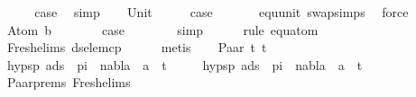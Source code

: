 \begin{isabellebody}
\ \ \isamarkupfalse%
\ \isamarkupfalse%
\ {\isacharquery}{\kern0pt}case\ \isamarkupfalse%
\ simp\isanewline
{}\isamarkupfalse%
\isanewline
\ \ \isamarkupfalse%
\ Unit\isanewline
\ \ \isamarkupfalse%
\ \isamarkupfalse%
\ {\isacharquery}{\kern0pt}case\ \isanewline
\ \ \ \ \isamarkupfalse%
\ equ{\isacharunderscore}{\kern0pt}unit\ swap{\isachardot}{\kern0pt}simps{\isacharparenleft}{\kern0pt}{}{\isacharparenright}{\kern0pt}\ \isamarkupfalse%
\ force\isanewline
{}\isamarkupfalse%
\isanewline
\ \ \isamarkupfalse%
\ {\isacharparenleft}{\kern0pt}Atom\ b{\isacharparenright}{\kern0pt}\isanewline
\ \ \ \ \isamarkupfalse%
\ \isamarkupfalse%
\ {\isacharquery}{\kern0pt}case\isanewline
\ \ \ \ \ \ \isamarkupfalse%
\ simp\isanewline
\ \ \ \ \isamarkupfalse%
\ {\isacharparenleft}{\kern0pt}rule\ equ{\isacharunderscore}{\kern0pt}atom{\isacharparenright}{\kern0pt}\isanewline
\ \ \ \ \isamarkupfalse%
\ Fresh{\isacharunderscore}{\kern0pt}elims{\isacharparenleft}{\kern0pt}{}{\isacharparenright}{\kern0pt}\ ds{\isacharunderscore}{\kern0pt}elem{\isacharunderscore}{\kern0pt}cp\isanewline
\ \ \ \ \isamarkupfalse%
\ metis\isanewline
{}\isamarkupfalse%
\isanewline
\ \ \isamarkupfalse%
\ {\isacharparenleft}{\kern0pt}Paar\ t{}\ t{}{\isacharparenright}{\kern0pt}\isanewline
\ \ \isamarkupfalse%
\ \isamarkupfalse%
\ hypsp{}{\isacharcolon}{\kern0pt}\ {\isachardoublequoteopen}{\isacharparenleft}{\kern0pt}{\isasymforall}a{\isasymin}ds\ {\isacharbrackleft}{\kern0pt}{\isacharbrackright}{\kern0pt}\ pi{\isachardot}{\kern0pt}\ \ nabla\ {\isasymturnstile}\ a\ {\isasymsharp}\ t{}{\isacharparenright}{\kern0pt}{\isachardoublequoteclose}\isanewline
\ \ \ \ \ hypsp{}{\isacharcolon}{\kern0pt}\ {\isachardoublequoteopen}{\isacharparenleft}{\kern0pt}{\isasymforall}a{\isasymin}ds\ {\isacharbrackleft}{\kern0pt}{\isacharbrackright}{\kern0pt}\ pi{\isachardot}{\kern0pt}\ \ nabla\ {\isasymturnstile}\ a\ {\isasymsharp}\ t{}{\isacharparenright}{\kern0pt}{\isachardoublequoteclose}\isanewline
\ \ \ \ \isamarkupfalse%
\ Paar{\isachardot}{\kern0pt}prems\ Fresh{\isacharunderscore}{\kern0pt}elims{\isacharparenleft}{\kern0pt}{}{\isacharparenright}{\kern0pt}\ \isanewline

\end{isabellebody}
